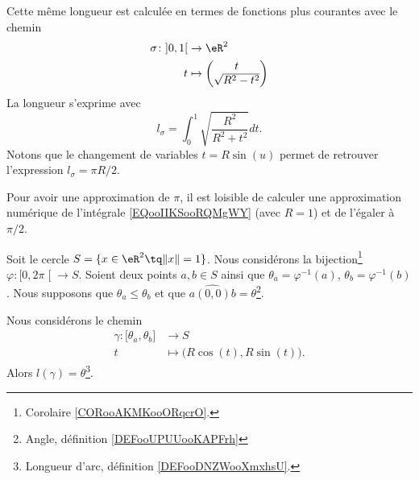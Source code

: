 \begin{example}
	Cette même longueur est calculée en termes de fonctions plus courantes avec le chemin
	\begin{equation}
		\begin{aligned}
			\sigma\colon \mathopen] 0 , 1 \mathclose[ & \to \eR^2                          \\
			t                                         & \mapsto \begin{pmatrix}
				t \\
				\sqrt{ R^2-t^2 }
			\end{pmatrix}
		\end{aligned}
	\end{equation}
	La longueur s'exprime avec
	\begin{equation}        \label{EQooIIKSooRQMgWY}
		l_{\sigma}=\int_0^1\sqrt{ \frac{ R^2 }{ R^2+t^2 } }dt.
	\end{equation}
	Notons que le changement de variables \( t=R\sin(u)\) permet de retrouver l'expression \( l_{\sigma}=\pi R/2\).

	Pour avoir une approximation de \( \pi\), il est loisible de calculer une approximation numérique de l'intégrale \eqref{EQooIIKSooRQMgWY} (avec \( R=1\)) et de l'égaler à \( \pi/2\).
\end{example}


\begin{proposition}     \label{PROPooDMSTooEOFExj}
    Soit le cercle \( S=\{ x\in \eR^2\tq \| x \|=1 \}\). Nous considérons la bijection\footnote{Corolaire \ref{CORooAKMKooORqcrO}.} \( \varphi\colon \mathopen[ 0 , 2\pi \mathclose[\to S\). Soient deux points \( a,b\in S\) ainsi que \( \theta_a=\varphi^{-1}(a)\), \( \theta_b=\varphi^{-1}(b)\). Nous supposons que \( \theta_a\leq \theta_b\) et que \( \widehat{a(0,0)b}=\theta\)\footnote{Angle, définition \ref{DEFooUPUUooKAPFrh}}.

    Nous considérons le chemin
    \begin{equation}
        \begin{aligned}
            \gamma\colon \mathopen[ \theta_a , \theta_b \mathclose]&\to S \\
            t&\mapsto \big( R\cos(t),R\sin(t) \big). 
        \end{aligned}
    \end{equation}
    Alors \( l(\gamma)=\theta\)\footnote{Longueur d'arc, définition \ref{DEFooDNZWooXmxhsU}.}.
\end{proposition}

